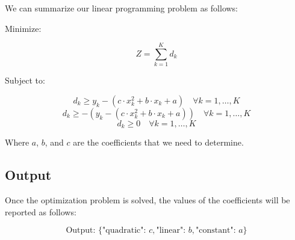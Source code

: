 \documentclass{article}
\begin{document}
We can summarize our linear programming problem as follows:

Minimize:

\[
Z = \sum_{k=1}^{K} d_k
\]

Subject to:

\[
d_k \geq y_k - (c \cdot x_k^2 + b \cdot x_k + a) \quad \forall k = 1, \ldots, K
\]
\[
d_k \geq -(y_k - (c \cdot x_k^2 + b \cdot x_k + a)) \quad \forall k = 1, \ldots, K
\]
\[
d_k \geq 0 \quad \forall k = 1, \ldots, K
\]

Where \(a\), \(b\), and \(c\) are the coefficients that we need to determine.

\subsection*{Output}

Once the optimization problem is solved, the values of the coefficients will be reported as follows:

\[
\text{Output: } \{ \text{"quadratic": } c, \text{"linear": } b, \text{"constant": } a \}
\]
\end{document}
